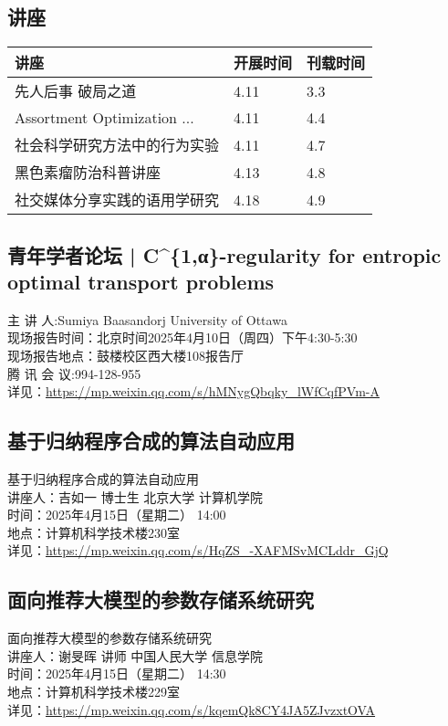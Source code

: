 \documentclass[letterpaper, 12pt]{article}
\begin{document}
\begin{multicols}{2}
\pagebreak

\section{讲座}
\begin{tabular}{|>{\centering\arraybackslash}m{}|m{}|m{}|}
    \hline
    讲座 & 开展时间 & 刊载时间\\
    \hline\hline
    先人后事 破局之道 & 4.11 & 3.3\\\hline
    Assortment Optimization ... & 4.11 & 4.4\\\hline
    社会科学研究方法中的行为实验 & 4.11 & 4.7\\\hline
    黑色素瘤防治科普讲座 & 4.13 & 4.8\\\hline
    社交媒体分享实践的语用学研究 & 4.18 & 4.9\\\hline
\end{tabular}
\subsection{青年学者论坛 | C\^{}\{1,α\}-regularity for entropic optimal transport problems}
主 讲 人:Sumiya Baasandorj    University of Ottawa
\\现场报告时间：北京时间2025年4月10日（周四）下午4:30-5:30
\\现场报告地点：鼓楼校区西大楼108报告厅
\\腾 讯 会 议:994-128-955
\\详见：\url{https://mp.weixin.qq.com/s/hMNygQbqky_lWfCqfPVm-A}

\subsection{基于归纳程序合成的算法自动应用}
基于归纳程序合成的算法自动应用
\\讲座人：吉如一 博士生 北京大学 计算机学院
\\时间：2025年4月15日（星期二） 14:00
\\地点：计算机科学技术楼230室
\\详见：\url{https://mp.weixin.qq.com/s/HqZS_-XAFMSvMCLddr_GjQ}

\subsection{面向推荐大模型的参数存储系统研究}
面向推荐大模型的参数存储系统研究
\\讲座人：谢旻晖 讲师 中国人民大学 信息学院
\\时间：2025年4月15日（星期二） 14:30
\\地点：计算机科学技术楼229室
\\详见：\url{https://mp.weixin.qq.com/s/kqemQk8CY4JA5ZJvzxtOVA}


\end{multicols}
\end{document}
